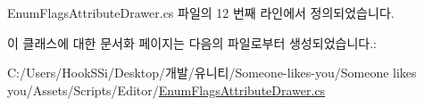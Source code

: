 Enum\+Flags\+Attribute\+Drawer.\+cs 파일의 12 번째 라인에서 정의되었습니다.


\begin{DoxyCode}{0}

\end{DoxyCode}


이 클래스에 대한 문서화 페이지는 다음의 파일로부터 생성되었습니다.\+:\begin{DoxyCompactItemize}
\item 
C\+:/\+Users/\+Hook\+S\+Si/\+Desktop/개발/유니티/\+Someone-\/likes-\/you/\+Someone likes you/\+Assets/\+Scripts/\+Editor/\mbox{\hyperlink{_enum_flags_attribute_drawer_8cs}{Enum\+Flags\+Attribute\+Drawer.\+cs}}\end{DoxyCompactItemize}
